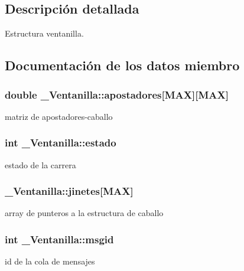 \subsection{Descripción detallada}
Estructura ventanilla. 

\subsection{Documentación de los datos miembro}
\subsubsection[{\texorpdfstring{apostadores}{apostadores}}]{\setlength{\rightskip}{0pt plus 5cm}double \+\_\+\+Ventanilla\+::apostadores\mbox{[}{\bf M\+AX}\mbox{]}\mbox{[}{\bf M\+AX}\mbox{]}}\hypertarget{struct__Ventanilla_a19ef890de873fe54c27d1726fb9ca947}{}\label{struct__Ventanilla_a19ef890de873fe54c27d1726fb9ca947}
matriz de apostadores-\/caballo 
\subsubsection[{\texorpdfstring{estado}{estado}}]{\setlength{\rightskip}{0pt plus 5cm}int \+\_\+\+Ventanilla\+::estado}\hypertarget{struct__Ventanilla_a6b5316b20a1be71403695aeac94346e5}{}\label{struct__Ventanilla_a6b5316b20a1be71403695aeac94346e5}
estado de la carrera 
\subsubsection[{\texorpdfstring{jinetes}{jinetes}}]{ \+\_\+\+Ventanilla\+::jinetes\mbox{[}{\bf M\+AX}\mbox{]}}\hypertarget{struct__Ventanilla_ab359f2cc43a4adf0b65ccf8ffd5cd145}{}\label{struct__Ventanilla_ab359f2cc43a4adf0b65ccf8ffd5cd145}
array de punteros a la estructura de caballo 
\subsubsection[{\texorpdfstring{msgid}{msgid}}]{\setlength{\rightskip}{0pt plus 5cm}int \+\_\+\+Ventanilla\+::msgid}\hypertarget{struct__Ventanilla_a66a8337f17a857c1ad379db598bba1c9}{}\label{struct__Ventanilla_a66a8337f17a857c1ad379db598bba1c9}
id de la cola de mensajes 
